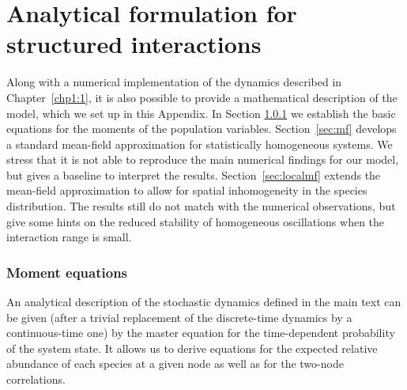 \chapter{\label{appen:MF}Analytical formulation for structured interactions}

Along with a numerical implementation of the dynamics described in Chapter~\ref{chp1:1}, it is
also possible to provide a mathematical description of the
model, which we set up in this Appendix. In Section
\ref{sec:moments} we establish the basic equations for the
moments of the population variables. Section~\ref{sec:mf}
develops a standard mean-field approximation for statistically
homogeneous systems. We stress that it is not able to reproduce
the main numerical findings for our model, but gives a baseline
to interpret the results. Section~\ref{sec:localmf} extends the
mean-field approximation to allow for spatial inhomogeneity in
the species distribution. The results still do not match with
the numerical observations, but give some hints on the reduced
stability of homogeneous oscillations when the interaction
range is small.

\subsection{Moment equations}
\label{sec:moments}

An analytical description of the stochastic dynamics defined in
the main text can be given (after a trivial replacement of the
discrete-time dynamics by a continuous-time one) by the master
equation for the time-dependent probability of the system
state. It allows us to derive equations for the expected
relative abundance of each species at a given node as well as
for the two-node correlations.

